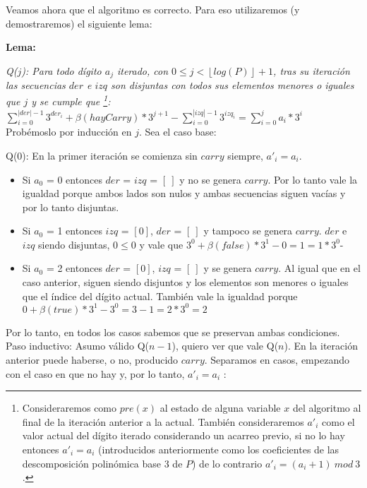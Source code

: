 	Veamos ahora que el algoritmo es correcto. Para eso utilizaremos (y demostraremos) el siguiente lema:

	\begin{center}
		\textbf{Lema:}
	\end{center}

	\emph{
	Q($j$): Para todo dígito $a_j$ iterado, con $0 \leq j < \left \lfloor{log(P)}\right \rfloor + 1$, tras su iteración las secuencias $der$ e $izq$ son disjuntas con todos sus elementos menores o iguales que $j$ y se cumple que \footnote{Consideraremos como $pre(x)$ al estado de alguna variable $x$ del algoritmo al final de la iteración anterior a la actual. También consideraremos $a'_i$ como el valor actual del dígito iterado considerando un acarreo previo, si no lo hay entonces $a'_i = a_i$ (introducidos anteriormente como los coeficientes de las descomposición polinómica base 3 de $P$) de lo contrario $a'_i = (a_i+1)\ mod\ 3$.}:
	}
	\\

	$\sum_{i=0}^{|der|-1} 3^{der_i} + \beta(hayCarry)*3^{j+1} - \sum_{i=0}^{|izq|-1} 3^{izq_i} = \sum_{i=0}^{j} a_i*3^{i}$
	\\

	Probémoslo por inducción en $j$. Sea el caso base:

	Q($0$): En la primer iteración se comienza sin $carry$ siempre, $a'_i = a_i$.

	\begin{itemize}
	\item Si $a_0$ = 0 entonces $der$ = $izq$ = $[\ ]$ y no se genera $carry$. Por lo tanto vale la igualdad porque ambos lados son nulos y ambas secuencias siguen vacías y por lo tanto disjuntas.
	\item Si $a_0$ = 1 entonces $izq$ = $[0]$, $der$ = $[\ ]$ y tampoco se genera $carry$. $der$ e $izq$ siendo disjuntas, $0 \leq 0$ y vale que $3^{0} + \beta(false)*3^{1} - 0 = 1 = 1*3^{0}$-
	\item Si $a_0$ = 2 entonces $der$ = $[0]$, $izq$ = $[\ ]$ y se genera $carry$. Al igual que en el caso anterior, siguen siendo disjuntos y los elementos son menores o iguales que el índice del dígito actual. También vale la igualdad porque $0 + \beta(true)*3^{1} - 3^{0} = 3 - 1 = 2*3^{0} = 2$
	\end{itemize}

	Por lo tanto, en todos los casos sabemos que se preservan ambas condiciones.
	\\

	Paso inductivo:
	Asumo válido Q($n-1$), quiero ver que vale Q($n$).
	En la iteración anterior puede haberse, o no, producido $carry$. Separamos en casos, empezando con el caso en que no hay y, por lo tanto, $a'_i = a_i$ :

